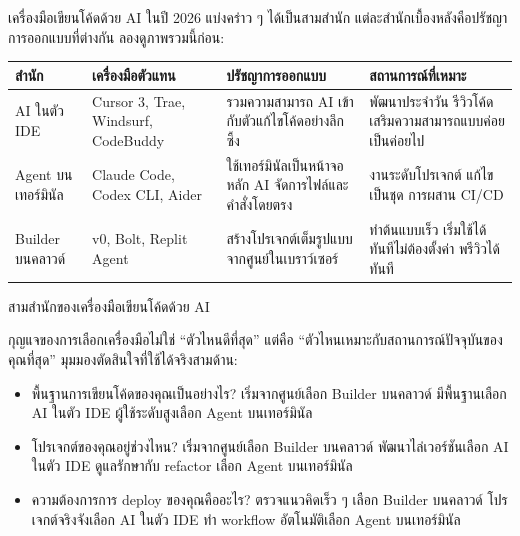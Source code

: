 


เครื่องมือเขียนโค้ดด้วย AI ในปี 2026 แบ่งคร่าว ๆ ได้เป็นสามสำนัก แต่ละสำนักเบื้องหลังคือปรัชญาการออกแบบที่ต่างกัน ลองดูภาพรวมนี้ก่อน:

\begin{center}
\begin{tabularx}{\linewidth}{|X|X|X|X|}
\hline
\textbf{สำนัก} & \textbf{เครื่องมือตัวแทน} & \textbf{ปรัชญาการออกแบบ} & \textbf{สถานการณ์ที่เหมาะ} \tabularnewline
\hline
AI ในตัว IDE & Cursor 3, Trae, Windsurf, CodeBuddy & รวมความสามารถ AI เข้ากับตัวแก้ไขโค้ดอย่างลึกซึ้ง & พัฒนาประจำวัน รีวิวโค้ด เสริมความสามารถแบบค่อยเป็นค่อยไป \tabularnewline
Agent บนเทอร์มินัล & Claude Code, Codex CLI, Aider & ใช้เทอร์มินัลเป็นหน้าจอหลัก AI จัดการไฟล์และคำสั่งโดยตรง & งานระดับโปรเจกต์ แก้ไขเป็นชุด การผสาน CI/CD \tabularnewline
Builder บนคลาวด์ & v0, Bolt, Replit Agent & สร้างโปรเจกต์เต็มรูปแบบจากศูนย์ในเบราว์เซอร์ & ทำต้นแบบเร็ว เริ่มใช้ได้ทันทีไม่ต้องตั้งค่า พรีวิวได้ทันที \tabularnewline
\hline
\end{tabularx}
\end{center}

\begin{center}\small\color{gray}สามสำนักของเครื่องมือเขียนโค้ดด้วย AI\end{center}

กุญแจของการเลือกเครื่องมือไม่ใช่ “ตัวไหนดีที่สุด” แต่คือ “ตัวไหนเหมาะกับสถานการณ์ปัจจุบันของคุณที่สุด” มุมมองตัดสินใจที่ใช้ได้จริงสามด้าน:

\begin{itemize}
  \item พื้นฐานการเขียนโค้ดของคุณเป็นอย่างไร? เริ่มจากศูนย์เลือก Builder บนคลาวด์ มีพื้นฐานเลือก AI ในตัว IDE ผู้ใช้ระดับสูงเลือก Agent บนเทอร์มินัล
  \item โปรเจกต์ของคุณอยู่ช่วงไหน? เริ่มจากศูนย์เลือก Builder บนคลาวด์ พัฒนาไล่เวอร์ชันเลือก AI ในตัว IDE ดูแลรักษากับ refactor เลือก Agent บนเทอร์มินัล
  \item ความต้องการการ deploy ของคุณคืออะไร? ตรวจแนวคิดเร็ว ๆ เลือก Builder บนคลาวด์ โปรเจกต์จริงจังเลือก AI ในตัว IDE ทำ workflow อัตโนมัติเลือก Agent บนเทอร์มินัล
\end{itemize}

